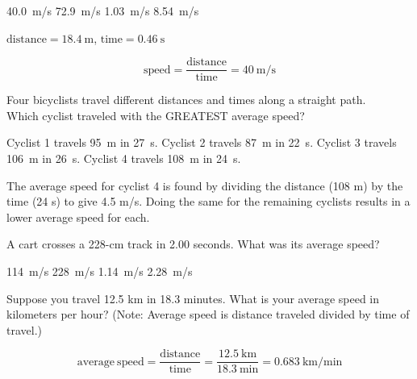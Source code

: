 \documentclass[]{exam}
\begin{document}
\begin{questions}
\begin{choices}
\correctchoice \SI{40.0}{m/s}
\choice \SI{72.9}{m/s}
\choice \SI{1.03}{m/s}
\choice \SI{8.54}{m/s}
\end{choices}

\begin{solution}
    $\text{distance} = \SI{18.4}{\meter}$, $\text{time}=\SI{0.46}{\second}$

\begin{equation*}
    \text{speed} = \frac{\text{distance}}{\text{time}} = \SI{40}{\meter/\second}
\end{equation*}
\end{solution}

\question
Four bicyclists travel different distances and times along a straight path. \\
Which cyclist traveled with the GREATEST average speed?

\begin{choices}
\choice Cyclist 1 travels \SI{95}{m} in \SI{27}{s}.
\choice Cyclist 2 travels \SI{87}{m} in \SI{22}{s}.
\choice Cyclist 3 travels \SI{106}{m} in \SI{26}{s}.
\CorrectChoice Cyclist 4 travels \SI{108}{m} in \SI{24}{s}.
\end{choices}

\begin{solution}
The average speed for cyclist 4 is found by dividing the distance (108 m) by the time (24 s) to give 4.5 m/s. Doing the same for the remaining cyclists results in a lower average speed for each.
\end{solution}


\question
A cart crosses a 228-cm track in 2.00 seconds. What was its average speed?

\begin{choices}
    \choice \SI{114}{m/s}
    \choice \SI{228}{m/s}
    \correctchoice \SI{1.14}{m/s}
    \choice \SI{2.28}{m/s}
\end{choices}

\question
Suppose you travel 12.5 km in 18.3 minutes. What is your average speed in kilometers per hour? (Note: Average speed is distance traveled divided by time of travel.)

\begin{solution}
\begin{equation*}
    \mathrm{average\ speed = \frac{distance}{time}} = \frac{\SI{12.5}{\kilo\meter}}{\SI{18.3}{\minute}} = \SI[per-mode=fraction]{0.683}{\kilo\meter\per\minute}
\end{equation*}


\end{solution}
\end{questions}
\end{document}
